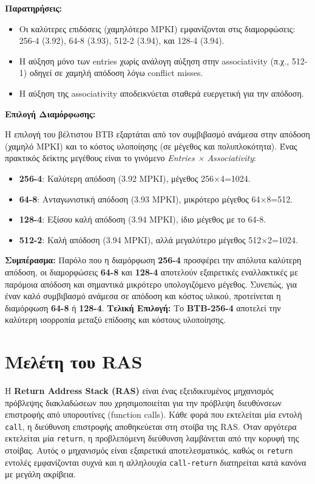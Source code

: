 \documentclass{article}
\begin{document}
\vspace{0.3cm} \textbf{Παρατηρήσεις:} \begin{itemize} \item Οι καλύτερες επιδόσεις (χαμηλότερο MPKI) εμφανίζονται στις διαμορφώσεις: 256-4 (3.92), 64-8 (3.93), 512-2 (3.94), και 128-4 (3.94). \item Η αύξηση μόνο των entries χωρίς ανάλογη αύξηση στην associativity (π.χ., 512-1) οδηγεί σε χαμηλή απόδοση λόγω conflict misses. \item Η αύξηση της associativity αποδεικνύεται σταθερά ευεργετική για την απόδοση. \end{itemize}

\vspace{0.3cm} \textbf{Επιλογή Διαμόρφωσης:}

Η επιλογή του βέλτιστου BTB εξαρτάται από τον συμβιβασμό ανάμεσα στην απόδοση (χαμηλό MPKI) και το κόστος υλοποίησης (σε μέγεθος και πολυπλοκότητα). Ένας πρακτικός δείκτης μεγέθους είναι το γινόμενο \textit{Entries × Associativity}:

\begin{itemize} \item \textbf{256-4}: Καλύτερη απόδοση (3.92 MPKI), μέγεθος 256×4=1024. \item \textbf{64-8}: Ανταγωνιστική απόδοση (3.93 MPKI), μικρότερο μέγεθος 64×8=512. \item \textbf{128-4}: Εξίσου καλή απόδοση (3.94 MPKI), ίδιο μέγεθος με το 64-8. \item \textbf{512-2}: Καλή απόδοση (3.94 MPKI), αλλά μεγαλύτερο μέγεθος 512×2=1024. \end{itemize}

\textbf{Συμπέρασμα:}
Παρόλο που η διαμόρφωση \textbf{256-4} προσφέρει την απόλυτα καλύτερη απόδοση, οι διαμορφώσεις \textbf{64-8} και \textbf{128-4} αποτελούν εξαιρετικές εναλλακτικές με παρόμοια απόδοση και σημαντικά μικρότερο υπολογιζόμενο μέγεθος. Συνεπώς, για έναν καλό συμβιβασμό ανάμεσα σε απόδοση και κόστος υλικού, προτείνεται η διαμόρφωση \textbf{64-8} ή \textbf{128-4}.
\vspace{0.3cm}
\noindent \textbf{Τελική Επιλογή:} Το \textbf{BTB-256-4} αποτελεί την καλύτερη ισορροπία μεταξύ επίδοσης και κόστους υλοποίησης.

\section{Μελέτη του RAS}
Η \textbf{Return Address Stack (RAS)} είναι ένας εξειδικευμένος μηχανισμός πρόβλεψης διακλαδώσεων που χρησιμοποιείται για την πρόβλεψη διευθύνσεων επιστροφής από υπορουτίνες (function calls). Κάθε φορά που εκτελείται μία εντολή \texttt{call}, η διεύθυνση επιστροφής αποθηκεύεται στη στοίβα της RAS. Όταν αργότερα εκτελείται μία \texttt{return}, η προβλεπόμενη διεύθυνση λαμβάνεται από την κορυφή της στοίβας. Αυτός ο μηχανισμός είναι εξαιρετικά αποτελεσματικός, καθώς οι \texttt{return} εντολές εμφανίζονται συχνά και η αλληλουχία \texttt{call-return} διατηρείται κατά κανόνα με μεγάλη ακρίβεια.
\end{document}
